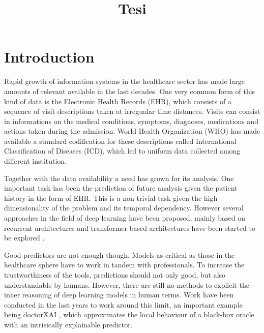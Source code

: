 \documentclass[]{marticle}
\title{\textbf{\huge Tesi}}
\date{}
\begin{document}
\maketitle
\newpage

\section{Introduction}

Rapid growth of information systems in the healthcare sector has made large amounts of relevant
available in the last decades. One very common form of this kind of data is the Electronic Health
Records (EHR), which consists of a sequence of visit descriptions taken at irregualar time
distances. Visits can consist in informations on the medical conditions, symptoms, diagnoses,
medications and actions taken during the admission. World Health Organization (WHO) has made
available a standard codification for these descriptions called International Classification of
Diseases (ICD), which led to uniform data collected among different institution.

Together with the data availability a need has grown for its analysis. One important task has been
the prediction of future analysis given the patient history in the form of EHR. This is a non
trivial task given the high dimensionality of the problem and its temporal dependency. However
several approaches in the field of deep learning have been proposed, mainly based on recurrent
architectures  and transformer-based architectures have been started to be explored
.

Good predictors are not enough though. Models as critical as those in the healthcare sphere have to
work in tandem with professionals. To increase the trustworthiness of the tools, predictions should
not only good, but also understandable by humans. However, there are still no methods to explicit
the inner reasoning of deep learning models in human terms. Work have been conducted in the last
years to work around this limit, an important example being doctorXAI \cite{panigutti-xai}, which
approximates the local behaviour of a black-box oracle with an intrisically explainable predictor.
\end{document}
